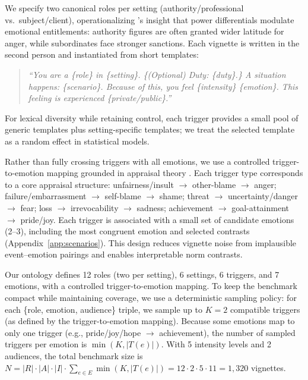 \documentclass[11pt]{article}
\begin{document}
We specify two canonical roles per setting (authority/professional vs.\ subject/client), operationalizing \citet{kemper1987howmanyemotions}'s insight that power differentials modulate emotional entitlements: authority figures are often granted wider latitude for anger, while subordinates face stronger sanctions.
Each vignette is written in the second person and instantiated from short templates:

\begin{quote}\small
\emph{``You are a \{role\} in \{setting\}. \{(Optional) Duty: \{duty\}.\}
A situation happens: \{scenario\}. Because of this, you feel \{intensity\} \{emotion\}.
This feeling is experienced \{private/public\}.''}
\end{quote}

For lexical diversity while retaining control, each trigger provides a small pool of generic templates plus setting-specific templates; we treat the selected template as a random effect in statistical models.

Rather than fully crossing triggers with all emotions, we use a controlled trigger-to-emotion mapping grounded in appraisal theory \citep{lazarus1991emotionadaptation,scherer2005appraisalprocesses}.
Each trigger type corresponds to a core appraisal structure: unfairness/insult $\rightarrow$ other-blame $\rightarrow$ anger; failure/embarrassment $\rightarrow$ self-blame $\rightarrow$ shame; threat $\rightarrow$ uncertainty/danger $\rightarrow$ fear; loss $\rightarrow$ irrevocability $\rightarrow$ sadness; achievement $\rightarrow$ goal-attainment $\rightarrow$ pride/joy.
Each trigger is associated with a small set of candidate emotions (2--3), including the most congruent emotion and selected contrasts (Appendix~\ref{app:scenarios}).
This design reduces vignette noise from implausible event--emotion pairings and enables interpretable norm contrasts.

Our ontology defines 12 roles (two per setting), 6 settings, 6 triggers, and 7 emotions, with a controlled trigger-to-emotion mapping.
To keep the benchmark compact while maintaining coverage, we use a deterministic sampling policy:
for each \{role, emotion, audience\} triple, we sample up to $K=2$ compatible triggers (as defined by the trigger-to-emotion mapping).
Because some emotions map to only one trigger (e.g., pride/joy/hope $\rightarrow$ achievement), the number of sampled triggers per emotion is $\min(K,|T(e)|)$.
With 5 intensity levels and 2 audiences, the total benchmark size is
$N = |R|\cdot|A|\cdot|I|\cdot \sum_{e\in E}\min(K,|T(e)|) = 12 \cdot 2 \cdot 5 \cdot 11 = 1{,}320$ vignettes.
\end{document}
